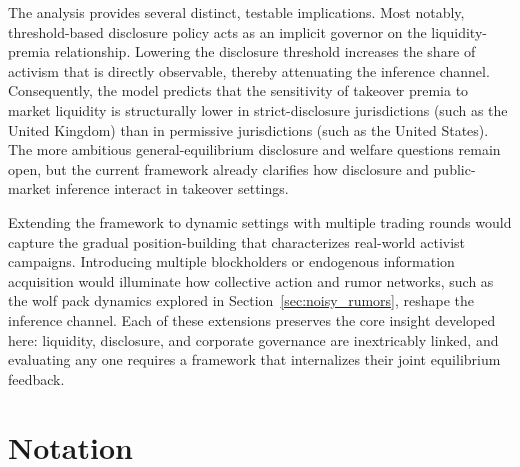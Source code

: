\documentclass[11pt]{article}
\newcommand{\1}{\mathbf{1}}
\begin{document}
The analysis provides several distinct, testable implications. Most notably, threshold-based disclosure policy acts as an implicit governor on the liquidity-premia relationship. Lowering the disclosure threshold increases the share of activism that is directly observable, thereby attenuating the inference channel. Consequently, the model predicts that the sensitivity of takeover premia to market liquidity is structurally lower in strict-disclosure jurisdictions (such as the United Kingdom) than in permissive jurisdictions (such as the United States). The more ambitious general-equilibrium disclosure and welfare questions remain open, but the current framework already clarifies how disclosure and public-market inference interact in takeover settings.

Extending the framework to dynamic settings with multiple trading rounds would capture the gradual position-building that characterizes real-world activist campaigns. Introducing multiple blockholders or endogenous information acquisition would illuminate how collective action and rumor networks, such as the wolf pack dynamics explored in Section~\ref{sec:noisy_rumors}, reshape the inference channel. Each of these extensions preserves the core insight developed here: liquidity, disclosure, and corporate governance are inextricably linked, and evaluating any one requires a framework that internalizes their joint equilibrium feedback.

\clearpage
{\begingroup\sloppy\setlength{\emergencystretch}{2em}\printbibliography\endgroup}

\appendix

\section{Notation}
\label{app:notation}
\end{document}
